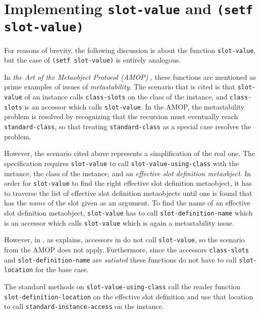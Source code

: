 \section{Implementing \texttt{slot-value} and \texttt{(setf slot-value)}}

For reasons of brevity, the following discussion is about the function
\texttt{slot-value}, but the case of \texttt{(setf slot-value)} is
entirely analogous. 

In \emph{the Art of the Metaobject Protocol (AMOP)}
\cite{Kiczales:1991:AMP:574212}, these functions are mentioned as
prime examples of issues of \emph{metastability}.  The scenario that
is cited is that \texttt{slot-value} of an instance calls
\texttt{class-slots} on the class of the instance, and
\texttt{class-slots} is an accessor which calls \texttt{slot-value}.
In the AMOP, the metastability problem is resolved by recognizing that
the recursion must eventually reach \texttt{standard-class}, so that
treating \texttt{standard-class} as a special case resolves the
problem.

However, the scenario cited above represents a simplification of the
real one.  The specification requires \texttt{slot-value} to call
\texttt{slot-value-using-class} with the instance, the class of the
instance, and an \emph{effective slot definition metaobject}.  In
order for \texttt{slot-value} to find the right effective slot
definition metaobject, it has to traverse the list of effective slot
definition metaobjects until one is found that has the \emph{name} of
the slot given as an argument.  To find the name of an effective slot
definition metaobject, \texttt{slot-value} has to call
\texttt{slot-definition-name} which is an accessor which calls
\texttt{slot-value} which is again a metastability issue.

However, in \sysname{}, as
 explains,
accessors in \sysname{} do not call \texttt{slot-value}, so the
scenario from the AMOP does not apply.  Furthermore, since the
accessors \texttt{class-slots} and \texttt{slot-definition-name} are
\emph{satiated}
 these
functions do not have to call \texttt{slot-location} for the base
case. 

The standard methods on \texttt{slot-value-using-class} call the
reader function \texttt{slot-definition-location} on the effective
slot definition and use that location to call
\texttt{standard-instance-access} on the instance.
